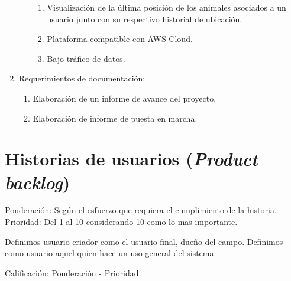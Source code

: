 \documentclass[11pt]{charter}
\begin{document}
\begin{enumerate}
\begin{enumerate}
\begin{enumerate}
		\item Visualización de la última posición de los animales asociados a un usuario junto con su respectivo historial de ubicación.
		\item Plataforma compatible con AWS Cloud.
		\item Bajo tráfico de datos.
		\end{enumerate}
	\end{enumerate}
\item Requerimientos de documentación:
	\begin{enumerate}
	\item Elaboración de un informe de avance del proyecto.
	\item Elaboración de informe de puesta en marcha.
	\end{enumerate}	
\end{enumerate}



\section{Historias de usuarios (\textit{Product backlog})}
\label{sec:backlog}

Ponderación: Según el esfuerzo que requiera el cumplimiento de la historia.
Prioridad: Del 1 al 10 considerando 10 como lo mas importante.

Definimos usuario criador como el usuario final, dueño del campo.
Definimos como usuario aquel quien hace un uso general del sistema.

Calificación: Ponderación - Prioridad.
\end{document}

